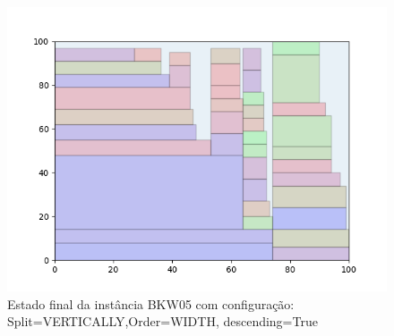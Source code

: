 \begin{figure}[H]
    \centering
    \caption[]{Estado final da instância BKW05 com configuração: Split=VERTICALLY,Order=WIDTH, descending=True}
    \label{fig:bkw05-vertically-width-true}
    \includegraphics[scale=0.5]{output/figures/bkw/bkw05/vertically/width/true/00}
\end{figure}